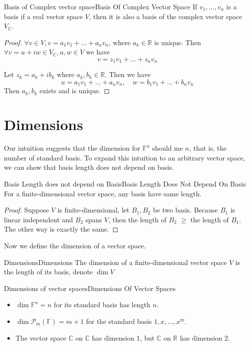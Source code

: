\documentclass[../main.tex]{subfiles}
\begin{document}
\begin{theorem}{Basis of Complex vector space}{Basis Of Complex Vector Space}
If $v_1, \ldots ,v_n$ is a basis if a real vector space $V$, then it is also a basis of the complex vector space $V_{\mathbb{C}}$.
\end{theorem}
\begin{proof}
	$\forall v \in V, v = a_1v_1+ \ldots +a_nv_n$, where $a_k \in \mathbb{R}$ is unique.
	Then $\forall v = u+iw \in V_{\mathbb{C}}, u,w\in V$ we have
	\begin{equation*}
	v = z_1v_1+\ldots +z_nv_n
	\end{equation*}

	Let $z_k=a_k+ib_k$ where $a_k,b_k\in \mathbb{R}$. Then we have
	\begin{equation*}
	u = a_1v_1+\ldots +a_nv_n,\quad w=b_1v_1+\ldots +b_nv_n
	\end{equation*}
	Then $a_k,b_k$ exists and is unique.
\end{proof}


\section{Dimensions}
Our intuition suggests that the dimension for $\mathbb{F}^{n}$ should me $n$, that is, the number of standard basis. To expand this intuition to an arbitrary vector space, we can show that basis length does not depend on basis.

\begin{theorem}{Basis Length does not depend on Basis}{Basis Length Does Not Depend On Basis}
For a finite-dimensional vector space, any basis have same length.
\end{theorem}
\begin{proof}
Suppose $V$ is finite-dimensional, let $B_1,B_2$ be two basis. Because $B_1$ is linear independent and $B_2$ spans $V$, then the length of  $B_2$ $\geq $ the length of $B_1$. The other way is exactly the same.
\end{proof}

Now we define the dimension of a vector space.
\begin{definition}{Dimensions}{Dimensions}
The dimension of a finite-dimensional vector space $V$ is the length of its basis, denote $\dim V$
\end{definition}
\begin{example}{Dimensions of vector spaces}{Dimensions Of Vector Spaces}
\begin{itemize}
\item $\dim \mathbb{F}^{n} = n$ for its standard basis has length $n$.
\item $\dim \mathscr{P}_m(\mathbb{F}) = m+1$ for the standard basis $1,x, \ldots ,x^m$.
\item The vector space $\mathbb{C}$ on $\mathbb{C}$ has dimension 1, but $\mathbb{C}$ on $\mathbb{R}$ has dimension 2.
\end{itemize}
\end{example}
\end{document}
